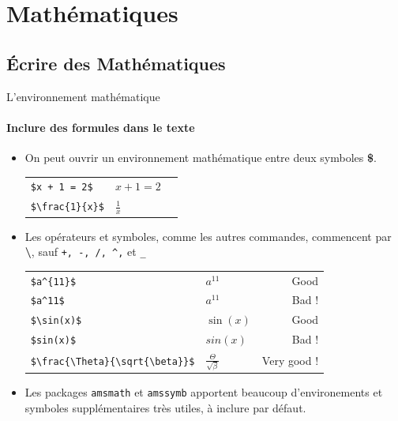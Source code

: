 \section{Mathématiques}

\subsection{Écrire des Mathématiques}

\begin{frame}[fragile]{L'environnement mathématique}
  \framesubtitle{Inclure des formules dans le texte}
  \begin{itemize}
      \item On peut ouvrir un environnement mathématique entre deux symboles \textbf{\$}.

  \begin{center}
    \begin{tabular}{lll}
      \lstinline|$x + 1 = 2$| & $x + 1 = 2$\\
      \medskip
      \lstinline|$\frac{1}{x}$| & $\frac{1}{x}$\\
    \end{tabular}
  \end{center}
      \item Les opérateurs et symboles, comme les autres commandes, commencent par \textbf{\textbackslash}, sauf \lstinline|+, -, /, ^,| et \lstinline|_|
      \begin{center}
          \begin{tabular}{llr}
              \lstinline|$a^{11}$| & $a^{11}$ & Good \\
              \lstinline|$a^11$| & $a^11$ & Bad ! \\
              \lstinline|$\sin(x)$| & $\sin(x)$ & Good \\
              \lstinline|$sin(x)$| & $sin(x)$ & Bad !\\
              \lstinline|$\frac{\Theta}{\sqrt{\beta}}$| & $\frac{\Theta}{\sqrt{\beta}}$ & Very good !
          \end{tabular}
      \end{center}
      \item Les packages \lstinline|amsmath| et \lstinline|amssymb| apportent beaucoup d'environements et symboles supplémentaires très utiles, à inclure par défaut.
  \end{itemize}
\end{frame}

